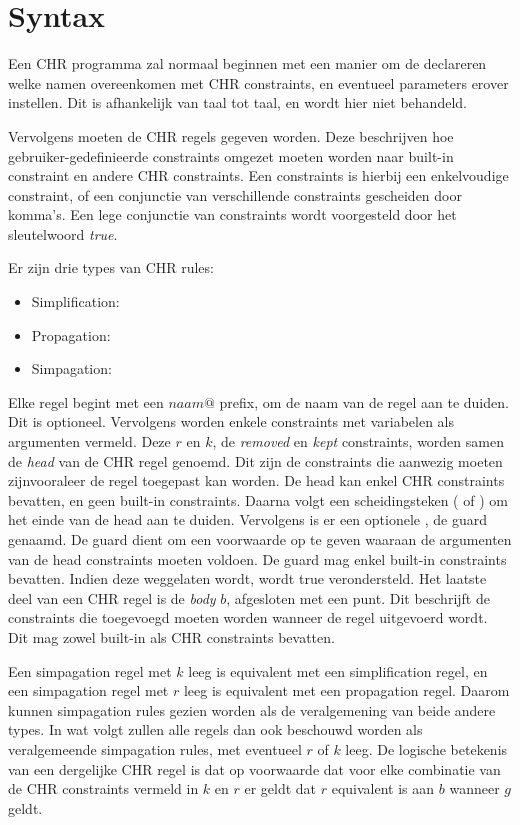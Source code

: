 \section{Syntax} \label{sec:chr-syntax}

Een CHR programma zal normaal beginnen met een manier om de declareren welke namen overeenkomen met CHR constraints, en eventueel parameters erover instellen. Dit is afhankelijk van taal tot taal, en wordt hier niet behandeld.

Vervolgens moeten de CHR regels gegeven worden. Deze beschrijven hoe gebruiker-gedefinieerde constraints omgezet moeten worden naar built-in constraint en andere CHR constraints. Een constraints is hierbij een enkelvoudige constraint, of een conjunctie van verschillende constraints gescheiden door komma's. Een lege conjunctie van constraints wordt voorgesteld door het sleutelwoord {\em true}. 

Er zijn drie types van CHR rules: \begin{itemize}
\item Simplification: 
\item Propagation: 
\item Simpagation: 
\end{itemize}
Elke regel begint met een $ naam @ $ prefix, om de naam van de regel aan te duiden. Dit is optioneel. Vervolgens worden enkele constraints met variabelen als argumenten vermeld. Deze $r$ en $k$, de {\em removed} en {\em kept} constraints, worden samen de {\em head} van de CHR regel genoemd. Dit zijn de constraints die aanwezig moeten zijnvooraleer de regel toegepast kan worden. De head kan enkel CHR constraints bevatten, en geen built-in constraints. Daarna volgt een scheidingsteken (\code{<=>} of \code{==>}) om het einde van de head aan te duiden. Vervolgens is er een optionele , de guard genaamd. De guard dient om een voorwaarde op te geven waaraan de argumenten van de head constraints moeten voldoen. De guard mag enkel built-in constraints bevatten. Indien deze weggelaten wordt, wordt true verondersteld. Het laatste deel van een CHR regel is de {\em body} $b$, afgesloten met een punt. Dit beschrijft de constraints die toegevoegd moeten worden wanneer de regel uitgevoerd wordt. Dit mag zowel built-in als CHR constraints bevatten.

Een simpagation regel met $k$ leeg is equivalent met een simplification regel, en een simpagation regel met $r$ leeg is equivalent met een propagation regel. Daarom kunnen simpagation rules gezien worden als de veralgemening van beide andere types. In wat volgt zullen alle regels dan ook beschouwd worden als veralgemeende simpagation rules, met eventueel $r$ of $k$ leeg. De logische betekenis van een dergelijke CHR regel is dat op voorwaarde dat voor elke combinatie van de CHR constraints vermeld in $k$ en $r$ er geldt dat $r$ equivalent is aan $b$ wanneer $g$ geldt.

